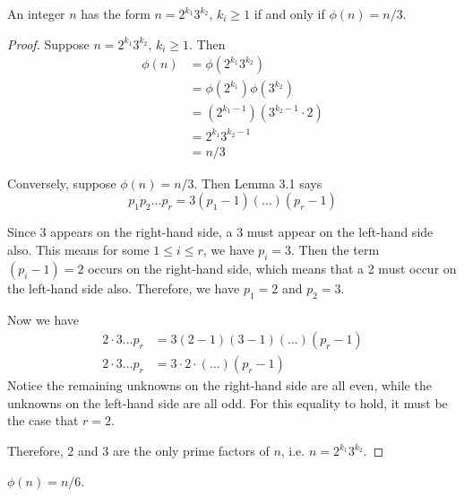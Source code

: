 \begin{prop}[11.12b]
    An integer $n$ has the form $n=2^{k_1} 3^{k_2}$, $k_i \geq 1$ if and only if 
    $\phi(n) = n/3$.
\end{prop}
\begin{proof}
    Suppose $n = 2^{k_1} 3^{k_2}$, $k_i \geq 1$. Then
    \begin{align*}
        \phi(n) &= \phi(2^{k_1} 3^{k_2}) \\
                &= \phi(2^{k_1}) \phi(3^{k_2}) \\
                &= (2^{k_1 - 1})(3^{k_2 - 1} \cdot 2) \\
                &= 2^{k_1} 3^{k_2 - 1} \\
                &= n/3
    \end{align*}
    
    Conversely, suppose $\phi(n) = n/3$. Then Lemma 3.1 says
    \[ p_1 p_2 \ldots p_r = 3 (p_1 - 1)(\ldots)(p_r - 1) \]
    
    Since 3 appears on the right-hand side, a 3 must appear on the left-hand 
    side also. This means for some $1 \leq i \leq r$, we have $p_i = 3$. Then
    the term $(p_i - 1) = 2$ occurs on the right-hand side, which means that
    a 2 must occur on the left-hand side also. Therefore, we have $p_1 = 2$ and
    $p_2 = 3$.
    
    Now we have
    \begin{align*}
    2 \cdot 3 \ldots p_r &= 3 (2 - 1)(3-1)(\ldots)(p_r - 1) \\
    2 \cdot 3 \ldots p_r &= 3 \cdot 2 \cdot (\ldots)(p_r - 1)
    \end{align*}
    Notice the remaining unknowns on the right-hand side are all even, while
    the unknowns on the left-hand side are all odd. For this equality to hold, 
    it must be the case that $r = 2$.
    
    Therefore, 2 and 3 are the only prime factors of $n$, i.e. 
    $n=2^{k_1} 3^{k_2}$.
\end{proof}


\begin{prop}[11.12c]
    $\phi(n) = n/6$.
\end{prop}
